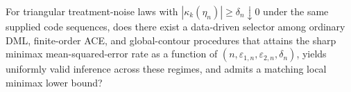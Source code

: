 For triangular treatment-noise laws with \(|\kappa_k(\eta_n)|\ge\delta_n\downarrow0\) under the same supplied code sequences, does there exist a data-driven selector among ordinary DML, finite-order ACE, and global-contour procedures that attains the sharp minimax mean-squared-error rate as a function of \((n,\varepsilon_{1,n},\varepsilon_{2,n},\delta_n)\), yields uniformly valid inference across these regimes, and admits a matching local minimax lower bound?